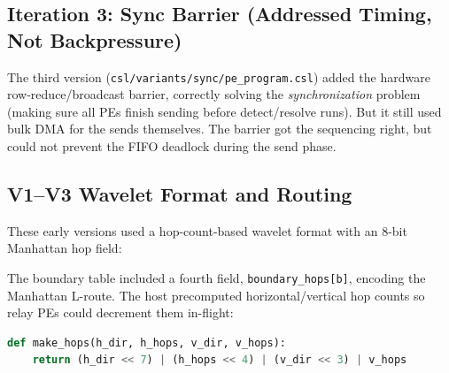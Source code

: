 \documentclass[11pt,letterpaper]{article}
\begin{document}
\subsection{Iteration 3: Sync Barrier (Addressed Timing, Not Backpressure)}

The third version (\texttt{csl/variants/sync/pe\_program.csl}) added the hardware row-reduce/broadcast barrier, correctly solving the \emph{synchronization} problem (making sure all PEs finish sending before detect/resolve runs). But it still used bulk DMA for the sends themselves. The barrier got the sequencing right, but could not prevent the FIFO deadlock during the send phase.

\subsection{V1--V3 Wavelet Format and Routing}

These early versions used a hop-count-based wavelet format with an 8-bit Manhattan hop field:

\begin{center}
\end{center}

The boundary table included a fourth field, \texttt{boundary\_hops[b]}, encoding the Manhattan L-route. The host precomputed horizontal/vertical hop counts so relay PEs could decrement them in-flight:

\begin{lstlisting}[language=Python, caption={Hops computation (V1--V3)}, label=lst:hops]
def make_hops(h_dir, h_hops, v_dir, v_hops):
    return (h_dir << 7) | (h_hops << 4) | (v_dir << 3) | v_hops
\end{lstlisting}
\end{document}
